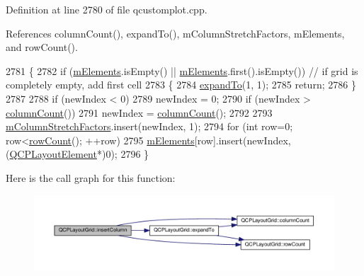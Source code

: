 Definition at line 2780 of file qcustomplot.\+cpp.



References column\+Count(), expand\+To(), m\+Column\+Stretch\+Factors, m\+Elements, and row\+Count().


\begin{DoxyCode}
2781 \{
2782   \textcolor{keywordflow}{if} (\hyperlink{class_q_c_p_layout_grid_a3577d3855bf8ad20ef9079291a49f397}{mElements}.isEmpty() || \hyperlink{class_q_c_p_layout_grid_a3577d3855bf8ad20ef9079291a49f397}{mElements}.first().isEmpty()) \textcolor{comment}{// if grid is completely empty,
       add first cell}
2783   \{
2784     \hyperlink{class_q_c_p_layout_grid_a886c0dcbabd51a45da399e044552b685}{expandTo}(1, 1);
2785     \textcolor{keywordflow}{return};
2786   \}
2787   
2788   \textcolor{keywordflow}{if} (newIndex < 0)
2789     newIndex = 0;
2790   \textcolor{keywordflow}{if} (newIndex > \hyperlink{class_q_c_p_layout_grid_ac39074eafd148b82d0762090f258189e}{columnCount}())
2791     newIndex = \hyperlink{class_q_c_p_layout_grid_ac39074eafd148b82d0762090f258189e}{columnCount}();
2792   
2793   \hyperlink{class_q_c_p_layout_grid_ac6aabe62339f94f18b9f8adab94b1840}{mColumnStretchFactors}.insert(newIndex, 1);
2794   \textcolor{keywordflow}{for} (\textcolor{keywordtype}{int} row=0; row<\hyperlink{class_q_c_p_layout_grid_af8e6c7a05864ebe610c87756c7b9079c}{rowCount}(); ++row)
2795     \hyperlink{class_q_c_p_layout_grid_a3577d3855bf8ad20ef9079291a49f397}{mElements}[row].insert(newIndex, (\hyperlink{class_q_c_p_layout_element}{QCPLayoutElement}*)0);
2796 \}
\end{DoxyCode}


Here is the call graph for this function\+:\nopagebreak
\begin{figure}[H]
\begin{center}
\leavevmode
\includegraphics[width=350pt]{class_q_c_p_layout_grid_a1e880a321dbe8b43b471ccd764433dc4_cgraph}
\end{center}
\end{figure}


\hypertarget{class_q_c_p_layout_grid_a48af3dd7c3a653d9c3d7dd99bd02e838}{}
